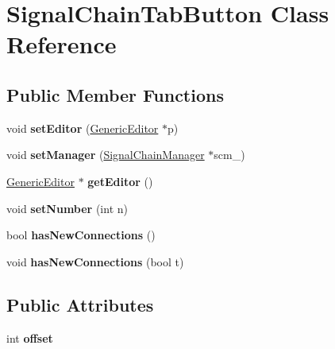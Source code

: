 \hypertarget{classSignalChainTabButton}{\section{Signal\-Chain\-Tab\-Button Class Reference}
\label{classSignalChainTabButton}
}
\subsection*{Public Member Functions}
\begin{DoxyCompactItemize}
\item 
\hypertarget{classSignalChainTabButton_a1cf991048d95a2d4f61b337b00fc998c}{void {\bfseries set\-Editor} (\hyperlink{classGenericEditor}{Generic\-Editor} $\ast$p)}\label{classSignalChainTabButton_a1cf991048d95a2d4f61b337b00fc998c}

\item 
\hypertarget{classSignalChainTabButton_af1a7b2e2ad12fb97ef23faf0546c65e9}{void {\bfseries set\-Manager} (\hyperlink{classSignalChainManager}{Signal\-Chain\-Manager} $\ast$scm\-\_\-)}\label{classSignalChainTabButton_af1a7b2e2ad12fb97ef23faf0546c65e9}

\item 
\hypertarget{classSignalChainTabButton_a4fa278c7907b1f0d0b2284fc0e2c278e}{\hyperlink{classGenericEditor}{Generic\-Editor} $\ast$ {\bfseries get\-Editor} ()}\label{classSignalChainTabButton_a4fa278c7907b1f0d0b2284fc0e2c278e}

\item 
\hypertarget{classSignalChainTabButton_a6eea9cfbb95c76436324c8863121e6b5}{void {\bfseries set\-Number} (int n)}\label{classSignalChainTabButton_a6eea9cfbb95c76436324c8863121e6b5}

\item 
\hypertarget{classSignalChainTabButton_a79640058185f7d202bc2b8ef001cdcb3}{bool {\bfseries has\-New\-Connections} ()}\label{classSignalChainTabButton_a79640058185f7d202bc2b8ef001cdcb3}

\item 
\hypertarget{classSignalChainTabButton_a72c57cd3c717b6f9e60e85f6f303f275}{void {\bfseries has\-New\-Connections} (bool t)}\label{classSignalChainTabButton_a72c57cd3c717b6f9e60e85f6f303f275}

\end{DoxyCompactItemize}
\subsection*{Public Attributes}
\begin{DoxyCompactItemize}
\item 
\hypertarget{classSignalChainTabButton_aa496c1fd1cff3b6c3026166443053b83}{int {\bfseries offset}}\label{classSignalChainTabButton_aa496c1fd1cff3b6c3026166443053b83}

\end{DoxyCompactItemize}
